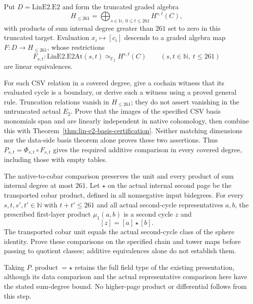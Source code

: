 \begin{proposition}
  \label{prop:lin-native-quotient-comparison}
  \notready
  Put $D=\mathrm{LinE2.E2}$ and form the truncated graded algebra
  \[
    H_{\le261}=\bigoplus_{s\in\mathbb N,\ 0\le t\le261}H^{s,t}(C),
  \]
  with products of sum internal degree greater than $261$ set to zero
  in this truncated target. Evaluation $x_i\mapsto[c_i]$ descends to
  a graded algebra map $F:D\to H_{\le261}$, whose restrictions
  \[
    F_{s,t}:\mathrm{LinE2.E2At}(s,t)\simeq_{\mathbb F_2}H^{s,t}(C)
      \qquad(s,t\in\mathbb N,\ t\le261)
  \]
  are linear equivalences.

  For each CSV relation in a covered degree, give a cochain witness that
  its evaluated cycle is a boundary, or derive such a witness using a
  proved general rule. Truncation relations vanish in $H_{\le261}$;
  they do not assert vanishing in the untruncated actual $E_2$.
  Prove that the images of the specified CSV basis monomials span and
  are linearly independent in native cohomology, then combine this with
  Theorem~\ref{thm:lin-e2-basis-certification}. Neither matching dimensions
  nor the data-side basis theorem alone proves these two assertions.
  Thus $P_{s,t}=\Phi_{s,t}\circ F_{s,t}$ gives the required additive
  comparison in every covered degree, including those with empty tables.
\end{proposition}

\begin{proposition}
  \label{prop:lin-native-actual-product}
  \notready
  The native-to-cobar comparison preserves the unit and every product of
  sum internal degree at most $261$. Let $\star$ on the actual internal
  second page be the transported cobar product, defined in all nonnegative
  input bidegrees. For every $s,t,s',t'\in\mathbb N$ with $t+t'\le261$
  and all actual second-cycle representatives $a,b$, the prescribed
  first-layer product $\mu_1(a,b)$ is a second cycle $z$ and
  \[
    [z]=[a]\star[b].
  \]
  The transported cobar unit equals the actual second-cycle class of the
  sphere identity. Prove these comparisons on the specified chain and
  tower maps before passing to quotient classes; additive equivalences
  alone do not establish them.

  Taking $P.\operatorname{product}=\star$ retains the full field type of
  the existing presentation, although its data comparison and the actual
  representative comparison here have the stated sum-degree bound.
  No higher-page product or differential follows from this step.
\end{proposition}

